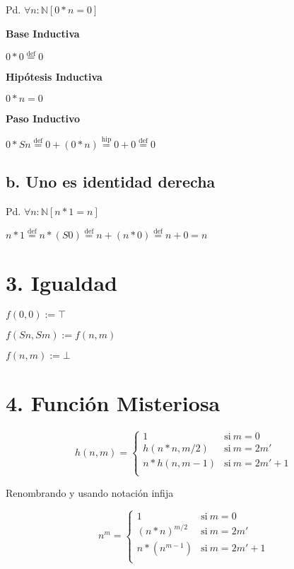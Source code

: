 \documentclass[spanish,]{article}
\begin{document}
Pd. \(\forall n : \mathbb{N} [0*n = 0]\)

\textbf{Base Inductiva}

\(0*0 \overset{\text{def}}=0\)

\textbf{Hipótesis Inductiva}

\(0*n = 0\)

\textbf{Paso Inductivo}

\(0*Sn \overset{\text{def}}=0 + (0*n) \overset{\text{hip}}=0 + 0 \overset{\text{def}}=0\)

\hypertarget{b.-uno-es-identidad-derecha}{%
\subsection{b. Uno es identidad
derecha}\label{b.-uno-es-identidad-derecha}}

Pd. \(\forall n : \mathbb{N} [n*1 = n]\)

\(n*1 \overset{\text{def}}=n*(S 0) \overset{\text{def}}=n + (n * 0) \overset{\text{def}}=n + 0 = n\)

\hypertarget{igualdad}{%
\section{3. Igualdad}\label{igualdad}}

\(f(0,0) := \top\)

\(f(Sn,Sm) := f(n,m)\)

\(f(n,m) := \bot\)

\hypertarget{funciuxf3n-misteriosa}{%
\section{4. Función Misteriosa}\label{funciuxf3n-misteriosa}}

\[
h(n,m) =
    \begin{cases}
        1           & \text{si} \ m = 0 \\
        h(n*n, m/2) & \text{si} \ m = 2m' \\
        n*h(n, m-1) & \text{si} \ m = 2m' + 1 \\
    \end{cases}
\]

Renombrando y usando notación infija

\[
n^m =
    \begin{cases}
        1           & \text{si} \ m = 0 \\
        (n*n)^{m/2} & \text{si} \ m = 2m' \\
        n*(n^{m-1}) & \text{si} \ m = 2m' + 1 \\
    \end{cases}
\]
\end{document}
